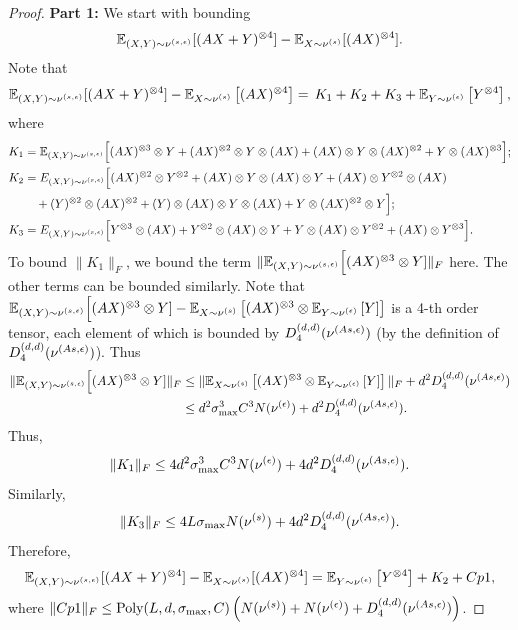 \begin{proof}
	\vspace{5mm}
	{\bf Part 1:} We start with bounding 
	\[
	\mathbb{E}_{(X,Y)\sim \nu^{(s,\epsilon)}} [(AX+Y)^{\otimes 4}]- \mathbb{E}_{X\sim \nu^{(s)}}[(AX)^{\otimes 4}].
	\]
	Note that 
	\begin{align*}
	\mathbb{E}_{(X,Y)\sim \nu^{(s,\epsilon)}} [(AX+Y)^{\otimes 4}] - \mathbb{E}_{X\sim \nu^{(s)}}\left[(AX)^{\otimes 4}\right] = \, K_1 + K_2 + K_3 + \mathbb{E}_{Y\sim \nu^{(\epsilon)}}\left[Y^{\otimes 4}\right],
	\end{align*}
	where 
	\begin{align*}
	K_1 & = \mathbb{E}_{(X,Y)\sim \nu^{(s,\epsilon)}} \Big[(AX)^{\otimes 3}\otimes Y + (AX)^{\otimes 2}\otimes Y\otimes (AX) + (AX)\otimes Y\otimes (AX)^{\otimes 2} + Y\otimes (AX)^{\otimes 3}\Big];\\
	K_2 & = E_{(X,Y)\sim \nu^{(s,\epsilon)}} \Big[(AX)^{\otimes 2}\otimes Y^{\otimes 2} + (AX)\otimes Y\otimes (AX)\otimes Y + (AX)\otimes Y^{\otimes 2}\otimes (AX) \\
	& \quad +  (Y)^{\otimes 2}\otimes (AX)^{\otimes 2} + (Y)\otimes (AX)\otimes Y\otimes (AX) + Y\otimes (AX)^{\otimes 2}\otimes Y\Big];\\
	K_3 & = E_{(X,Y)\sim \nu^{(s,\epsilon)}} \Big[Y^{\otimes 3}\otimes (AX) + Y^{\otimes 2}\otimes (AX)\otimes Y + Y\otimes (AX)\otimes Y^{\otimes 2} + (AX)\otimes Y^{\otimes 3}\Big].
	\end{align*}
	To bound $\|K_1\|_F$, we bound the term $\| \mathbb{E}_{(X,Y)\sim \nu^{(s,\epsilon)}} \Big[(AX)^{\otimes 3}\otimes Y] \|_F$ here. The other terms can be bounded similarly. Note that 
	$\mathbb{E}_{(X,Y)\sim \nu^{(s,\epsilon)}} \Big[(AX)^{\otimes 3}\otimes Y]  - \mathbb{E}_{X\sim \nu^{(s)}} \left[(AX)^{\otimes 3} \otimes \mathbb{E}_{Y\sim \nu^{(\epsilon)}}\left[Y\right]\right] $ is a 4-th order tensor, each element of which is bounded by $D_4^{(d,d)}(\nu^{(As,\epsilon)})$ (by the definition of $D_4^{(d,d)}(\nu^{(As,\epsilon)})$). Thus
	\begin{align*}
	\| \mathbb{E}_{(X,Y)\sim \nu^{(s,\epsilon)}} \Big[(AX)^{\otimes 3}\otimes Y] \|_F & \le \| \mathbb{E}_{X\sim \nu^{(s)}} \left[(AX)^{\otimes 3} \otimes \mathbb{E}_{Y\sim \nu^{(\epsilon)}}\left[Y\right]\right] \|_F + d^2D_4^{(d,d)}(\nu^{(As,\epsilon)}) \\
	& \le d^2\sigma_{\max}^3C^3N(\nu^{(\epsilon)}) + d^2D_4^{(d,d)}(\nu^{(As,\epsilon)}) .
	\end{align*}
	Thus, 
	\begin{equation*}
	\| K_1\|_F \le 4d^2\sigma_{\max}^3C^3N(\nu^{(\epsilon)}) + 4d^2D_4^{(d,d)}(\nu^{(As,\epsilon)}).
	\end{equation*}
	Similarly, 
	\begin{equation*}
	\| K_3\|_F \le 4L\sigma_{\max}N(\nu^{(s)})+ 4d^2D_4^{(d,d)}(\nu^{(As,\epsilon)}).
	\end{equation*}
	Therefore, 
	\begin{equation}
	\label{eq:A2part1}
	\mathbb{E}_{(X,Y)\sim \nu^{(s,\epsilon)}} [(AX+Y)^{\otimes 4}]- \mathbb{E}_{X\sim \nu^{(s)}}[(AX)^{\otimes 4}]
	= \mathbb{E}_{Y\sim \nu^{(\epsilon)}}\left[Y^{\otimes 4}\right] +K_2 + Cp1,
	\end{equation}
	where $\|Cp1\|_F \le \text{Poly}(L, d, \sigma_{\max}, C)\left(N(\nu^{(s)})+N(\nu^{(\epsilon)})+D_4^{(d,d)}(\nu^{(As,\epsilon)}) \right) $.
	

\end{proof}
